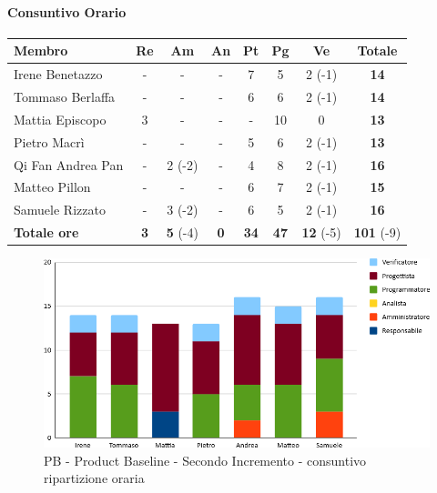 \paragraph{Consuntivo Orario}
\begin{center}
	\renewcommand{\arraystretch}{1.8} %
	\begin{tabular}{ |m{8em}|c|c|c|c|c|c|c| }
	\hline
	\textbf{Membro} & \textbf{Re} & \textbf{Am} &  \textbf{An} &  \textbf{Pt} &  \textbf{Pg} &  \textbf{Ve} &  \textbf{Totale}\\
    \hline
    Irene Benetazzo   & - & -  & -  & 7  & 5 & 2 (-1) & \textbf{14} \\
    \hline
    Tommaso Berlaffa  & - & - & -  & 6 & 6  & 2 (-1) & \textbf{14} \\
    \hline
    Mattia Episcopo   & 3 & -  & -  & - & 10 & 0 & \textbf{13} \\
    \hline
    Pietro Macrì      & - & -  & - & 5 & 6 & 2 (-1) & \textbf{13} \\
    \hline
    Qi Fan Andrea Pan & - & 2 (-2) & - & 4 & 8 & 2 (-1) & \textbf{16} \\
    \hline
    Matteo Pillon     & - & - & - & 6 & 7 & 2 (-1) & \textbf{15} \\
    \hline
    Samuele Rizzato   & - & 3 (-2) & - & 6 & 5 & 2 (-1) & \textbf{16} \\
    \hline
    \textbf{Totale ore} & \textbf{3} & \textbf{5} (-4) & \textbf{0} &  \textbf{34} &  \textbf{47} &  \textbf{12} (-5) &  \textbf{101} (-9)\\
    \hline
	\end{tabular}
\end{center}
\begin{figure}[H]
    \centering\includegraphics[width=\textwidth, height=\textheight,keepaspectratio]{images/consuntivo/consuntivo-PB-ore-secondo-incremento.png}
    \caption{PB - Product Baseline - Secondo Incremento - consuntivo ripartizione oraria}
\end{figure}

